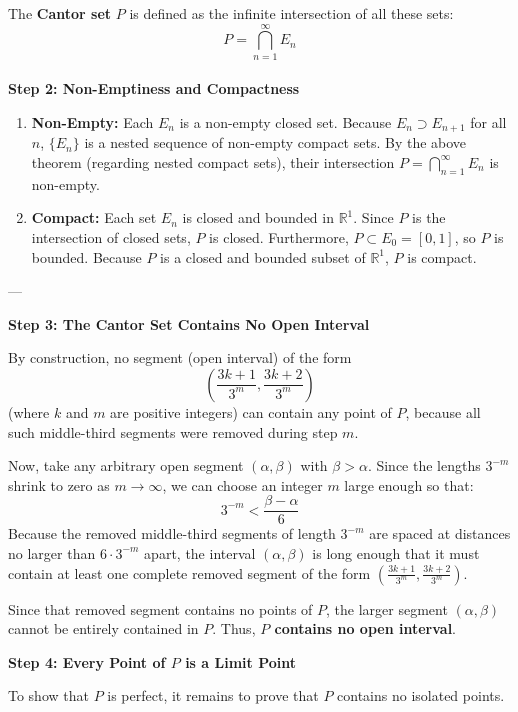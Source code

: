 \documentclass{article}
\theoremstyle{mythm}
\begin{document}
The \textbf{Cantor set} $P$ is defined as the infinite intersection of all these sets:
\[ P = \bigcap_{n=1}^\infty E_n \]
\\
\textbf{Step 2: Non-Emptiness and Compactness}
\begin{enumerate}
    \item \textbf{Non-Empty:} Each $E_n$ is a non-empty closed set. Because $E_n \supset E_{n+1}$ for all $n$, $\{E_n\}$ is a nested sequence of non-empty compact sets. By the above theorem (regarding nested compact sets), their intersection $P = \bigcap_{n=1}^\infty E_n$ is non-empty.
    \item \textbf{Compact:} Each set $E_n$ is closed and bounded in $\mathbb{R}^1$. Since $P$ is the intersection of closed sets, $P$ is closed. Furthermore, $P \subset E_0 = [0, 1]$, so $P$ is bounded. Because $P$ is a closed and bounded subset of $\mathbb{R}^1$, $P$ is compact.
\end{enumerate}

---

\textbf{Step 3: The Cantor Set Contains No Open Interval}

By construction, no segment (open interval) of the form
\[ \left(\frac{3k+1}{3^m}, \frac{3k+2}{3^m}\right) \]
(where $k$ and $m$ are positive integers) can contain any point of $P$, because all such middle-third segments were removed during step $m$.

Now, take any arbitrary open segment $(\alpha, \beta)$ with $\beta > \alpha$. 
Since the lengths $3^{-m}$ shrink to zero as $m \to \infty$, we can choose an integer $m$ large enough so that:
\[ 3^{-m} < \frac{\beta - \alpha}{6} \]
Because the removed middle-third segments of length $3^{-m}$ are spaced at distances no larger than $6 \cdot 3^{-m}$ apart, the interval $(\alpha, \beta)$ is long enough that it must contain at least one complete removed segment of the form $\left(\frac{3k+1}{3^m}, \frac{3k+2}{3^m}\right)$. 

Since that removed segment contains no points of $P$, the larger segment $(\alpha, \beta)$ cannot be entirely contained in $P$. Thus, \textbf{$P$ contains no open interval}.

\textbf{Step 4: Every Point of $P$ is a Limit Point}

To show that $P$ is perfect, it remains to prove that $P$ contains no isolated points.
\end{document}
